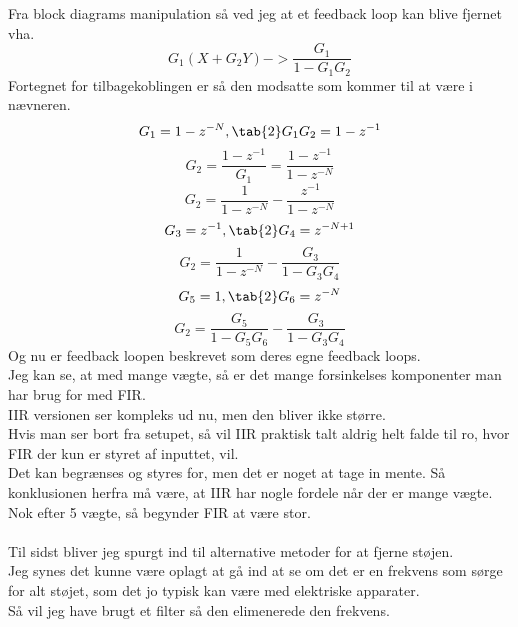\begin{Øvelser}
\begin{kapitel}
\begin{Øvelse}
            Fra block diagrams manipulation så ved jeg at et feedback loop kan blive fjernet vha. 
            \[G_1 (X + G_2 Y) -> \frac{G_1}{1 - G_1G_2}\]
            Fortegnet for tilbagekoblingen er så den modsatte som kommer til at være i nævneren.
            \[G_1 = 1 - z^{-N},\tab{2} G_1G_2 = 1 - z^{-1}\]
            \[G_2 = \frac{1 - z^{-1}}{G_1} = \frac{1 - z^{-1}}{1 - z^{-N}}\]
            \[G_2 = \frac{1}{1 - z^{-N}} - \frac{z^{-1}}{1 - z^{-N}}\]
            \[G_3 = z^{-1}, \tab{2} G_4 = z^{-N + 1}\]
            \[G_2 = \frac{1}{1 - z^{-N}} - \frac{G_3}{1 - G_3G_4}\]
            \[G_5 = 1, \tab{2} G_6 = z^{-N}\]
            \[G_2 = \frac{G_5}{1 - G_5G_6} - \frac{G_3}{1 - G_3G_4}\]
            Og nu er feedback loopen beskrevet som deres egne feedback loops.
            \\
            Jeg kan se, at med mange vægte, så er det mange forsinkelses komponenter man har brug for med FIR. \\
            IIR versionen ser kompleks ud nu, men den bliver ikke større.\\
            Hvis man ser bort fra setupet, så vil IIR praktisk talt aldrig helt falde til ro, hvor FIR der kun er styret af inputtet, vil.\\
            Det kan begrænses og styres for, men det er noget at tage in mente.            
            Så konklusionen herfra må være, at IIR har nogle fordele når der er mange vægte. Nok efter 5 vægte, så begynder FIR at være stor.\\\\

            Til sidst bliver jeg spurgt ind til alternative metoder for at fjerne støjen. \\
            Jeg synes det kunne være oplagt at gå ind at se om det er en frekvens som sørge for alt støjet, som det jo typisk kan være med elektriske apparater. \\
            Så vil jeg have brugt et filter så den elimenerede den frekvens.           
        \end{Øvelse}
        \clearpage


\end{kapitel}
\end{Øvelser}
